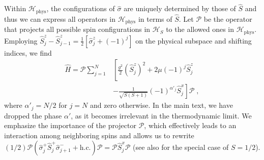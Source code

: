 \documentclass[aps,prl,reprint,twocolumn,superscriptaddress,floatfix,nofootinbib]{revtex4-1}
\begin{document}
Within $\mathcal{H}_\text{phys}$, the configurations of $\hat{\sigma}$ are uniquely determined by those of $\hat{S}$ and thus we can express all operators in $\mathcal{H}_\text{phys}$ in terms of $\hat{S}$. Let $\mathcal{P}$ be the operator that projects all possible spin configurations in $\mathcal{H}_S$ to the allowed ones in $\mathcal{H}_\text{phys}$.  Employing $\hat{S}^z_{j} - \hat{S}^z_{j-1} = \frac{1}{2} \left[ \hat{\sigma}^z_{j} + (-1)^j\right]$ on the physical subspace and shifting indices, we find
\begin{align}
	\hat{H} = \mathcal{P}\sum_{j=1}^{N} &\left[ \frac{g^2}{2} (\hat{S}^{z}_{j})^2 + 2 \mu (-1)^j  \hat{S}^z_{j}  \right. \nonumber \\
	&- \left.\frac{1}{\sqrt{S(S+1)}} (-1)^{\alpha'_j}\hat{S}^x_{j}  \right]\mathcal{P} \; ,
\end{align}
where $\alpha'_j = N/2$ for $j=N$ and zero otherwise. In the main text, we have dropped the phase $\alpha'$, as it becomes irrelevant in the thermodynamic limit. We emphasize the importance of the projector $\mathcal{P}$, which effectively leads to an interaction among neighboring spins and allows us to rewrite
$(1/2) \mathcal{P}\left(\hat{\sigma}^+_{j} \hat{S}^+_{j} \hat{\sigma}^-_{j+1} + \text{h.c.}\right)\mathcal{P} = \mathcal{P}\hat{S}^x_{j} \mathcal{P}$ (see also \cite{surace2020lattice} for the special case of $S=1/2$).
\end{document}
